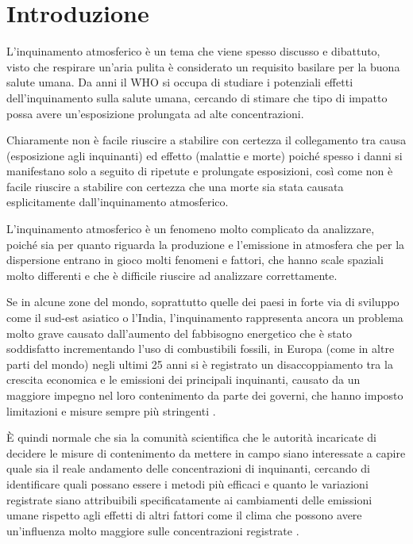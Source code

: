
\tableofcontents


\chapter{Introduzione}
L'inquinamento atmosferico è un tema che viene spesso discusso e dibattuto, visto che respirare un'aria pulita è considerato un requisito basilare per la buona salute umana. Da anni il WHO \cite{world2006air} si occupa di studiare i potenziali effetti dell'inquinamento sulla salute umana, cercando di stimare che tipo di impatto possa avere un'esposizione prolungata ad alte concentrazioni.  

Chiaramente non è facile riuscire a stabilire con certezza il collegamento tra causa (esposizione agli inquinanti) ed effetto (malattie e morte) poiché spesso i danni si manifestano solo a seguito di ripetute e prolungate esposizioni, così come non è facile riuscire a stabilire con certezza che una morte sia stata causata esplicitamente dall'inquinamento atmosferico.  

L'inquinamento atmosferico è un fenomeno molto complicato da analizzare, poiché sia per quanto riguarda la produzione e l'emissione in atmosfera che per la dispersione entrano in gioco molti fenomeni e fattori, che hanno scale spaziali molto differenti e che è difficile riuscire ad analizzare correttamente.  

Se in alcune zone del mondo, soprattutto quelle dei paesi in forte via di sviluppo come il sud-est asiatico o l'India, l'inquinamento rappresenta ancora un problema molto grave causato dall'aumento del fabbisogno energetico che è stato soddisfatto incrementando l'uso di combustibili fossili, in Europa (come in altre parti del mondo) negli ultimi 25 anni si è registrato un disaccoppiamento tra la crescita economica e le emissioni dei principali inquinanti, causato da un maggiore impegno nel loro contenimento da parte dei governi, che hanno imposto limitazioni e misure sempre più stringenti \cite{cattani2014analisi}.

È quindi normale che sia la comunità scientifica che le autorità incaricate di decidere le misure di contenimento da mettere in campo siano interessate a capire quale sia il reale andamento delle concentrazioni di inquinanti, cercando di identificare quali possano essere i metodi più efficaci e quanto le variazioni registrate siano attribuibili specificatamente ai cambiamenti delle emissioni umane rispetto agli effetti di altri fattori come il clima che possono avere un'influenza molto maggiore sulle concentrazioni registrate \cite{porter2001ozone}.  

